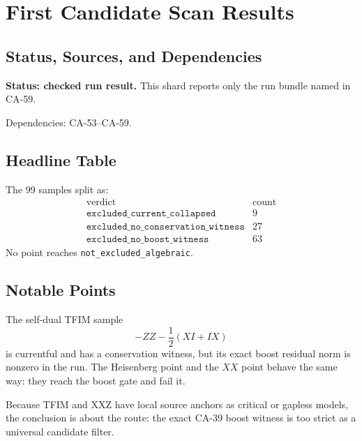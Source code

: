 
\section{First Candidate Scan Results}
\label{sec:qubit-candidate-scan-results}

\subsection{Status, Sources, and Dependencies}

\textbf{Status: checked run result.}  This shard reports only the run bundle
named in CA-59.

Dependencies: CA-53--CA-59.


\subsection{Headline Table}

The 99 samples split as:
\[
\begin{array}{c|c}
\text{verdict} & \text{count}\\
\hline
\texttt{excluded\_current\_collapsed} & 9\\
\texttt{excluded\_no\_conservation\_witness} & 27\\
\texttt{excluded\_no\_boost\_witness} & 63
\end{array}
\]
No point reaches \texttt{not\_excluded\_algebraic}.

\subsection{Notable Points}

The self-dual TFIM sample
\[
  -ZZ-\frac12(XI+IX)
\]
is currentful and has a conservation witness, but its exact boost residual norm
is nonzero in the run.  The Heisenberg point and the \(XX\) point behave the
same way: they reach the boost gate and fail it.

Because TFIM and XXZ have local source anchors as critical or gapless models,
the conclusion is about the route: the exact CA-39 boost witness is too strict
as a universal candidate filter.
